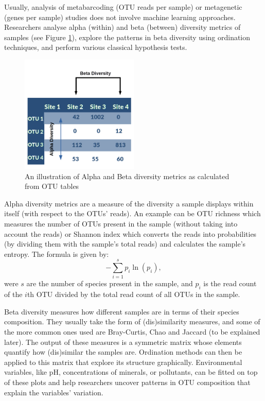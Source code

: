 Usually, analysis of metabarcoding (OTU reads per sample) or metagenetic (genes per sample) studies does not involve machine learning approaches. Researchers analyse alpha (within) and beta (between) diversity metrics of samples (see Figure \ref{fig:otu}), explore the patterns in beta diversity using ordination techniques, and perform various classical hypothesis tests. 

\begin{figure}
	\centering
	\includegraphics[width=0.5\textwidth]{otutable}
	\caption{An illustration of Alpha and Beta diversity metrics as calculated from OTU tables}
	\label{fig:otu}
\end{figure}

Alpha diversity metrics are a measure of the diversity a sample displays within itself (with respect to the OTUs' reads). An example can be OTU richness which measures the number of OTUs present in the sample (without taking into account the reads) or Shannon index which converts the reads into probabilities (by dividing them with the sample's total reads) and calculates the sample's entropy. The formula is given by:
$$-\sum_{i=1}^s p_i \ln(p_i),$$
were $s$ are the number of species present in the sample, and $p_i$ is the read count of the $i$th OTU divided by the total read count of all OTUs in the sample. 

Beta diversity measures how different samples are in terms of their species composition. They usually take the form of (dis)similarity measures, and some of the more common ones used are Bray-Curtis, Chao and Jaccard (to be explained later). The output of these measures is a symmetric matrix whose elements quantify how (dis)similar the samples are. Ordination methods can then be applied to this matrix that explore its structure graphically. Environmental variables, like pH, concentrations of minerals, or pollutants, can be fitted on top of these plots and help researchers uncover patterns in OTU composition that explain the variables' variation.

